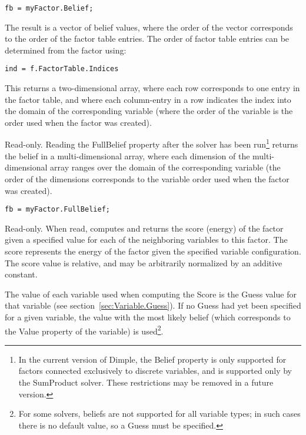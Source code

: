 \begin{lstlisting}
fb = myFactor.Belief;
\end{lstlisting}

The result is a vector of belief values, where the order of the vector corresponds to the order of the factor table entries.  The order of factor table entries can be determined from the factor using:

\begin{lstlisting}
ind = f.FactorTable.Indices
\end{lstlisting}

This returns a two-dimensional array, where each row corresponds to one entry in the factor table, and where each column-entry in a row indicates the index into the domain of the corresponding variable (where the order of the variable is the order used when the factor was created).


\label{sec:Factor.FullBelief}

Read-only.  Reading the FullBelief property after the solver has been run\footnote{In the current version of Dimple, the Belief property is only supported for factors connected exclusively to discrete variables, and is supported only by the SumProduct solver.  These restrictions may be removed in a future version.} returns the belief in a multi-dimensional array, where each dimension of the multi-dimensional array ranges over the domain of the corresponding variable (the order of the dimensions corresponds to the variable order used when the factor was created).

\begin{lstlisting}
fb = myFactor.FullBelief;
\end{lstlisting}


\label{sec:Factor.Score}

Read-only.  When read, computes and returns the score (energy) of the factor given a specified value for each of the neighboring variables to this factor.  The score represents the energy of the factor given the specified variable configuration.  The score value is relative, and may be arbitrarily normalized by an additive constant.

The value of each variable used when computing the Score is the Guess value for that variable (see section~\ref{sec:Variable.Guess}).  If no Guess had yet been specified for a given variable, the value with the most likely belief (which corresponds to the Value property of the variable) is used\footnote{For some solvers, beliefs are not supported for all variable types; in such cases there is no default value, so a Guess must be specified.}.


